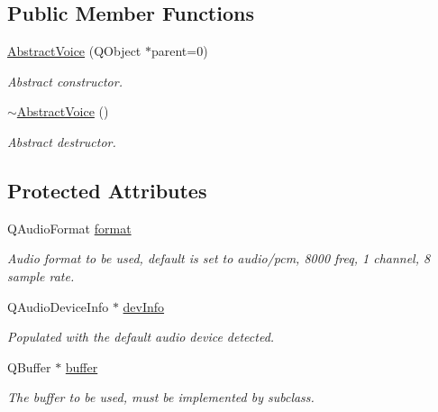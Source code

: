 \subsection*{\-Public \-Member \-Functions}
\begin{DoxyCompactItemize}
\item 
\hyperlink{class_abstract_voice_a6b3c93369820d5e9e65f596dcf2147be}{\-Abstract\-Voice} (\-Q\-Object $\ast$parent=0)
\begin{DoxyCompactList}\small\item\em \-Abstract constructor. \end{DoxyCompactList}\item 
\hyperlink{class_abstract_voice_a93d6515cf6e84cad397efe6b339a1b0c}{$\sim$\-Abstract\-Voice} ()
\begin{DoxyCompactList}\small\item\em \-Abstract destructor. \end{DoxyCompactList}\end{DoxyCompactItemize}
\subsection*{\-Protected \-Attributes}
\begin{DoxyCompactItemize}
\item 
\-Q\-Audio\-Format \hyperlink{class_abstract_voice_aa8718f0af1669ef7a84347c2d9a54cf9}{format}
\begin{DoxyCompactList}\small\item\em \-Audio format to be used, default is set to audio/pcm, 8000 freq, 1 channel, 8 sample rate. \end{DoxyCompactList}\item 
\hypertarget{class_abstract_voice_ac27882c5cb69564cbc4d5cca7847a359}{
\-Q\-Audio\-Device\-Info $\ast$ \hyperlink{class_abstract_voice_ac27882c5cb69564cbc4d5cca7847a359}{dev\-Info}}
\label{class_abstract_voice_ac27882c5cb69564cbc4d5cca7847a359}

\begin{DoxyCompactList}\small\item\em \-Populated with the default audio device detected. \end{DoxyCompactList}\item 
\-Q\-Buffer $\ast$ \hyperlink{class_abstract_voice_a93b7c2b08aa97b77b8126a8dff173018}{buffer}
\begin{DoxyCompactList}\small\item\em \-The buffer to be used, must be implemented by subclass. \end{DoxyCompactList}\end{DoxyCompactItemize}


